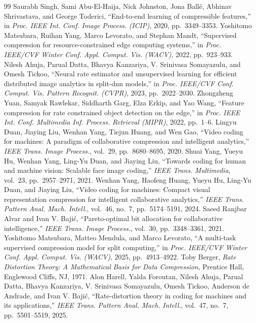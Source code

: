 \begin{thebibliography}{99}\small
{} Saurabh Singh, Sami Abu-El-Haija, Nick Johnston, Jona Ballé, Abhinav Shrivastava, and George Toderici, ``End-to-end learning of compressible features,'' in \emph{Proc. IEEE Int. Conf. Image Process. (ICIP)}, 2020, pp.~3349--3353.
 Yoshitomo Matsubara, Ruihan Yang, Marco Levorato, and Stephan Mandt, ``Supervised compression for resource-constrained edge computing systems,'' in \emph{Proc. IEEE/CVF Winter Conf. Appl. Comput. Vis. (WACV)}, 2022, pp.~923--933.
 Nilesh Ahuja, Parual Datta, Bhavya Kanzariya, V. Srinivasa Somayazulu, and Omesh Tickoo, ``Neural rate estimator and unsupervised learning for efficient distributed image analytics in split-dnn models,'' in \emph{Proc. IEEE/CVF Conf. Comput. Vis. Pattern Recognit. (CVPR)}, 2023, pp.~2022--2030.
 Zhongzheng Yuan, Samyak Rawlekar, Siddharth Garg, Elza Erkip, and Yao Wang, ``Feature compression for rate constrained object detection on the edge,'' in \emph{Proc. IEEE Int. Conf. Multimedia Inf. Process. Retrieval (MIPR)}, 2022, pp.~1--6.
 Lingyu Duan, Jiaying Liu, Wenhan Yang, Tiejun Huang, and Wen Gao, ``Video coding for machines: A paradigm of collaborative compression and intelligent analytics,'' \emph{IEEE Trans. Image Process.}, vol.~29, pp.~8680--8695, 2020.
 Shuai Yang, Yueyu Hu, Wenhan Yang, Ling-Yu Duan, and Jiaying Liu, ``Towards coding for human and machine vision: Scalable face image coding,'' \emph{IEEE Trans. Multimedia}, vol.~23, pp.~2957--2971, 2021.
 Wenhan Yang, Haofeng Huang, Yueyu Hu, Ling-Yu Duan, and Jiaying Liu, ``Video coding for machines: Compact visual representation compression for intelligent collaborative analytics,'' \emph{IEEE Trans. Pattern Anal. Mach. Intell.}, vol.~46, no.~7, pp.~5174--5191, 2024.
 Saeed Ranjbar Alvar and Ivan V. Bajić, ``Pareto-optimal bit allocation for collaborative intelligence,'' \emph{IEEE Trans. Image Process.}, vol.~30, pp.~3348--3361, 2021.
 Yoshitomo Matsubara, Matteo Mendula, and Marco Levorato, ``A multi-task supervised compression model for split computing,'' in \emph{Proc. IEEE/CVF Winter Conf. Appl. Comput. Vis. (WACV)}, 2025, pp.~4913--4922.
 Toby Berger, \emph{Rate Distortion Theory: A Mathematical Basis for Data Compression}, Prentice Hall, Englewood Cliffs, NJ, 1971.
 Alon Harell, Yalda Foroutan, Nilesh Ahuja, Parual Datta, Bhavya Kanzariya, V. Srinivasa Somayazulu, Omesh Tickoo, Anderson de Andrade, and Ivan V. Bajić, ``Rate-distortion theory in coding for machines and its applications,'' \emph{IEEE Trans. Pattern Anal. Mach. Intell.}, vol.~47, no.~7, pp.~5501--5519, 2025.

\end{thebibliography}
